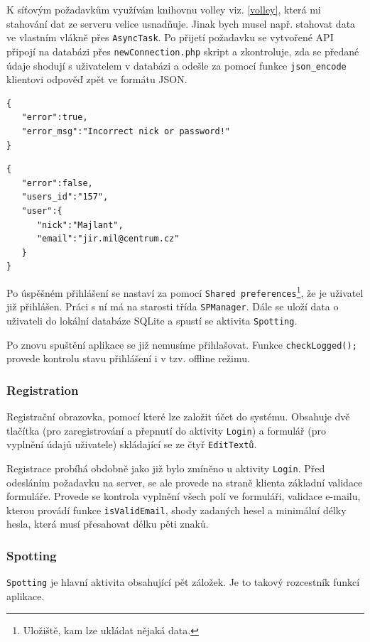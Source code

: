 \documentclass[12pt]{article}
\begin{document}
K síťovým požadavkům využívám knihovnu volley viz. \ref{volley}, která mi stahování dat ze serveru velice usnadňuje. Jinak bych musel např. stahovat data ve vlastním vlákně přes \verb+AsyncTask+. Po přijetí požadavku se vytvořené API připojí na databázi přes \verb+newConnection.php+ skript a zkontroluje, zda se předané údaje shodují s uživatelem v databázi a odešle za pomocí funkce \verb+json_encode+ klientovi odpověď zpět ve formátu JSON.
\begin{lstlisting}[title=Ukázka odpovědi s chybovou zprávou]
{
   "error":true,
   "error_msg":"Incorrect nick or password!"
}
\end{lstlisting}
\begin{lstlisting}[title=Ukázka odpovědi s úspěšným přihlášením]
{
   "error":false,
   "users_id":"157",
   "user":{
      "nick":"Majlant",
      "email":"jir.mil@centrum.cz"
   }
}
\end{lstlisting}

Po úspěšném přihlášení se nastaví za pomocí \verb+Shared preferences+\footnote[10]{Uložiště, kam lze ukládat nějaká data.}, že je uživatel již přihlášen.  Práci s ní má na starosti třída \verb+SPManager+. Dále se uloží data o uživateli do lokální databáze SQLite a spustí se aktivita \verb+Spotting+. 

Po znovu spuštění aplikace se již nemusíme přihlašovat. Funkce \verb+checkLogged();+ provede kontrolu stavu přihlášení i v tzv. offline režimu.
\subsubsection{Registration}
Registrační obrazovka, pomocí které lze založit účet do systému. Obsahuje dvě tlačítka (pro zaregistrování a přepnutí do aktivity \verb+Login+) a formulář (pro vyplnění údajů uživatele) skládající se ze čtyř \verb+EditTextů+.

Registrace probíhá obdobně jako již bylo zmíněno u aktivity \verb+Login+. Před odesláním požadavku na server, se ale provede na straně klienta základní validace formuláře. Provede se kontrola vyplnění všech polí ve formuláři, validace e-mailu, kterou provádí funkce \verb+isValidEmail+, shody zadaných hesel a minimální délky hesla, která musí přesahovat délku pěti znaků.
\subsubsection{Spotting}
\verb+Spotting+ je hlavní aktivita obsahující pět záložek. Je to takový rozcestník funkcí aplikace.
\end{document}
